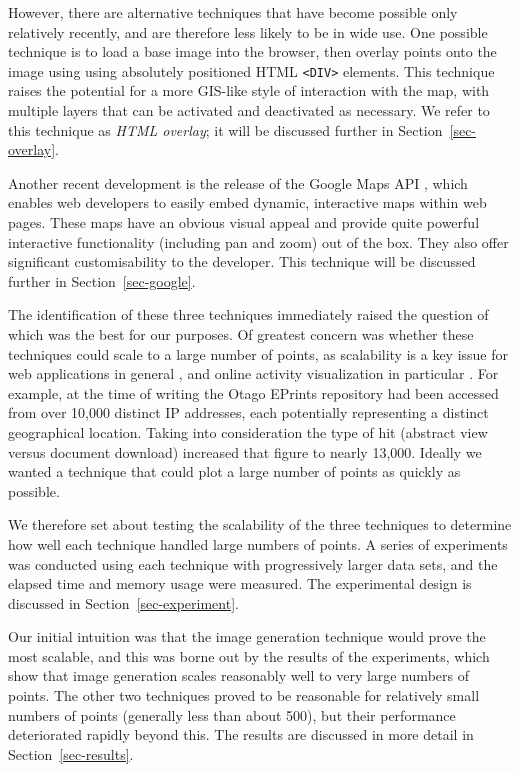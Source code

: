 \documentclass[acmtocl,acmnow]{acmtrans2m}
\begin{document}
However, there are alternative techniques that have become possible only
relatively recently, and are therefore less likely to be in wide use.
One possible technique is to load a base image into the browser, then
overlay points onto the image using using absolutely positioned HTML
\verb|<DIV>| elements. This technique raises the potential for a more
GIS-like style of interaction with the map, with multiple layers that
can be activated and deactivated as necessary.  We refer to this
technique as \emph{HTML overlay}; it will be discussed further in
Section~\ref{sec-overlay}.

Another recent development is the release of the Google Maps API
\cite{Goog-M-2006-maps}, which enables web developers to easily embed
dynamic, interactive maps within web pages. These maps have an obvious
visual appeal and provide quite powerful interactive functionality
(including pan and zoom) out of the box. They also offer significant
customisability to the developer. This technique will be discussed
further in Section~\ref{sec-google}.

The identification of these three techniques immediately raised the
question of which was the best for our purposes. Of greatest concern was
whether these techniques could scale to a large number of points, as
scalability is a key issue for web applications in general \cite[p.\
28]{Offu-J-2002-quality}, and online activity visualization in
particular \cite[p.\ 50]{Eick-SG-2001-sitevis}. For example, at the time
of writing the Otago EPrints repository had been accessed from over
10,000 distinct IP addresses, each potentially representing a distinct
geographical location. Taking into consideration the type of hit
(abstract view versus document download) increased that figure to nearly
13,000. Ideally we wanted a technique that could plot a large number of
points as quickly as possible.

We therefore set about testing the scalability of the three techniques
to determine how well each technique handled large numbers of points. A
series of experiments was conducted using each technique with
progressively larger data sets, and the elapsed time and memory usage
were measured. The experimental design is discussed in
Section~\ref{sec-experiment}.

Our initial intuition was that the image generation technique would
prove the most scalable, and this was borne out by the results of the
experiments, which show that image generation scales reasonably well to
very large numbers of points. The other two techniques proved to be
reasonable for relatively small numbers of points (generally less than
about 500), but their performance deteriorated rapidly beyond this. The
results are discussed in more detail in Section~\ref{sec-results}.
\end{document}
